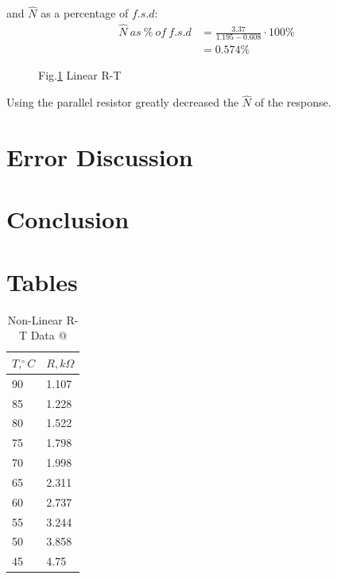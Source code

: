 \documentclass[a4,11pt]{article}
\makeatletter
\newcommand*{\rom}[1]{\expandafter\@slowromancap\romannumeral #1@}
\makeatother
\begin{document}
and $\hat N$ as a percentage of $f.s.d$:
\begin{equation}
  \begin{aligned}
    \hat N\ as\ \%\ of\ f.s.d & = \frac{3.37}{1.195-0.608} \cdot 100 \% \\
    &=0.574\%
  \end{aligned}
\end{equation}
\begin{figure}[H]
  \centering
  \label{fig:with-raw}
  Fig.\ref{fig:with-raw} Linear R-T 
\end{figure}
Using the parallel resistor greatly decreased the $\hat N$ of the response.
\section{Error Discussion}
\section{Conclusion}
\section{Tables}

\begin{table}
  \centering
  \caption{Non-Linear R-T Data \rom{1}}
  \begin{tabular}{l|l}
  \hline
  $T, ^{\circ}C$ & $R, k\Omega$ \\
  \hline
  90 & 1.107  \\
  85 & 1.228  \\
  80 & 1.522  \\
  75 & 1.798  \\
  70 & 1.998  \\
  65 & 2.311  \\
  60 & 2.737  \\
  55 & 3.244  \\
  50 & 3.858  \\
  45 & 4.75  \\
  \hline
\end{tabular}
\end{table}
\end{document}
